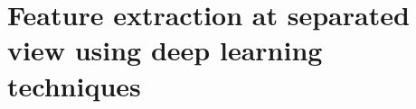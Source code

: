 
\section{Feature extraction at separated view using deep learning techniques} \label{sec:private}
    
    
